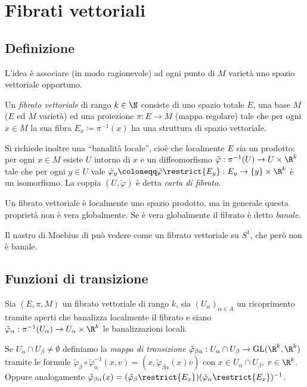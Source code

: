\chapter{Fibrati vettoriali}

\section{Definizione}

L'idea è associare (in modo ragionevole) ad ogni punto di $M$ varietà uno spazio vettoriale opportuno.

\begin{definition} 
	Un \emph{fibrato vettoriale} di rango $k\in\N$ consiste di uno spazio totale $E$, una base $M$ ($E$ ed $M$ varietà) ed una proiezione $\pi:E\to M$ (mappa regolare) tale che per ogni $x\in M$ la sua fibra $E_x\coloneqq \pi^{-1}(x)$ ha una struttura di spazio vettoriale.
	
	Si richiede inoltre una ``banalità locale'', cioè che localmente $E$ sia un prodotto: per ogni $x\in M$ esiste $U$ intorno di $x$ e un diffeomorfismo $\tilde\varphi:\pi^{-1}(U)\to U\times \R^k$ tale che per ogni $y\in U$ vale $\tilde\varphi_y\coloneqq \tilde\varphi\restrict{E_y}:E_y\to \{y\}\times \R^k$ è un isomorfismo.
	La coppia $(U,\tilde\varphi)$ è detta \emph{carta di fibrato}.
\end{definition}

\begin{remark}
	Un fibrato vettoriale è localmente uno spazio prodotto, ma in generale questa proprietà non è vera globalmente. Se è vera globalmente il fibrato è detto \emph{banale}.
\end{remark}

\begin{example} 
	Il nastro di Moebius di può vedere come un fibrato vettoriale su $S^1$, che però non è banale.
\end{example}

\section{Funzioni di transizione}

Sia $(E,\pi, M)$ un fibrato vettoriale di rango $k$, sia $(U_\alpha)_{\alpha\in A}$ un ricoprimento tramite aperti che banalizza localmente il fibrato e siano $\tilde\varphi_\alpha:\pi^{-1}(U_\alpha)\to U_\alpha\times \R^k$ le banalizzazioni locali.

\begin{definition} 
	Se $U_\alpha\cap U_\beta\ne \emptyset$ definiamo la \emph{mappa di transizione} $\tilde\varphi_{\beta\alpha}:U_\alpha \cap U_\beta \to \mathrm{GL}(\R^k,\R^k)$ tramite le formule $\tilde\varphi_\beta \circ \tilde\varphi_\alpha^{-1} (x,v) = (x, \tilde\varphi_{\beta\alpha}(x)v)$ con $x\in U_\alpha \cap U_\beta$, $v\in\R^k$. Oppure analogamente $\tilde\varphi_{\beta\alpha}(x) = (\tilde\varphi_\beta\restrict{E_x})(\tilde\varphi_\alpha\restrict{E_x})^{-1}$.
\end{definition}
	
